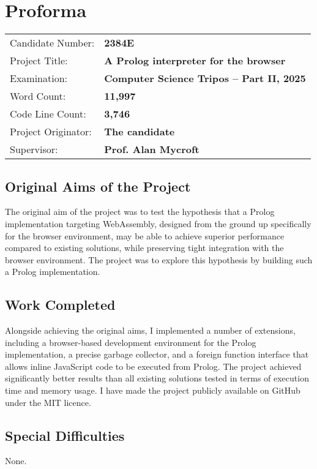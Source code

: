 \chapter*{Proforma}

{\large \begin{tabular}{ll}
Candidate Number: & {\bf 2384E} \\
Project Title: & {\bf A Prolog interpreter for the browser} \\
Examination: & {\bf Computer Science Tripos -- Part II, 2025} \\
Word Count: & {\bf 11,997}\footnotemark \\
Code Line Count: & {\bf 3,746}\footnotemark \\
Project Originator: & {\bf The candidate} \\
Supervisor: & {\bf Prof. Alan Mycroft}
\end{tabular}}


\section*{Original Aims of the Project}

The original aim of the project was to test the hypothesis that a Prolog implementation targeting WebAssembly, designed from the ground up specifically for the browser environment, may be able to achieve superior performance compared to existing solutions, while preserving tight integration with the browser environment. The project was to explore this hypothesis by building such a Prolog implementation.

\section*{Work Completed}

Alongside achieving the original aims, I implemented a number of extensions, including a browser-based development environment for the Prolog implementation, a precise garbage collector, and a foreign function interface that allows inline JavaScript code to be executed from Prolog. The project achieved significantly better results than all existing solutions tested in terms of execution time and memory usage. I have made the project publicly available on GitHub under the MIT licence.

\section*{Special Difficulties}

None.
